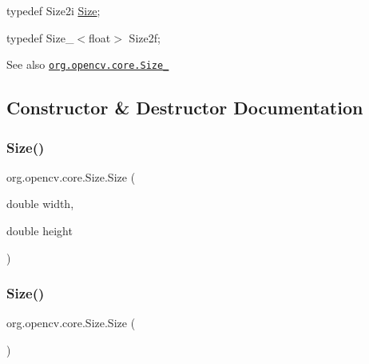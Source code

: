 {\ttfamily }

{\ttfamily }

{\ttfamily typedef Size2i \mbox{\hyperlink{classorg_1_1opencv_1_1core_1_1_size}{Size}};}

{\ttfamily }

{\ttfamily }

{\ttfamily typedef Size\+\_\+$<$float$>$ Size2f;}

{\ttfamily }

{\ttfamily \begin{DoxySeeAlso}{See also}
\href{http://docs.opencv.org/modules/core/doc/basic_structures.html#size}{\tt org.\+opencv.\+core.\+Size\+\_\+} 
\end{DoxySeeAlso}
}

\subsection{Constructor \& Destructor Documentation}
\mbox{\label{classorg_1_1opencv_1_1core_1_1_size_aaa2bd47901a6a258743307f77615f1b7}} 
\subsubsection{\texorpdfstring{Size()}{Size()}\hspace{0.1cm}{\footnotesize\ttfamily [1/4]}}
{\footnotesize\ttfamily org.\+opencv.\+core.\+Size.\+Size (\begin{DoxyParamCaption}\item[{double}]{width,  }\item[{double}]{height }\end{DoxyParamCaption})}

\mbox{\label{classorg_1_1opencv_1_1core_1_1_size_a13601fb7ccb9fd63c532ecc92dbac417}} 
\subsubsection{\texorpdfstring{Size()}{Size()}\hspace{0.1cm}{\footnotesize\ttfamily [2/4]}}
{\footnotesize\ttfamily org.\+opencv.\+core.\+Size.\+Size (\begin{DoxyParamCaption}{ }\end{DoxyParamCaption})}

